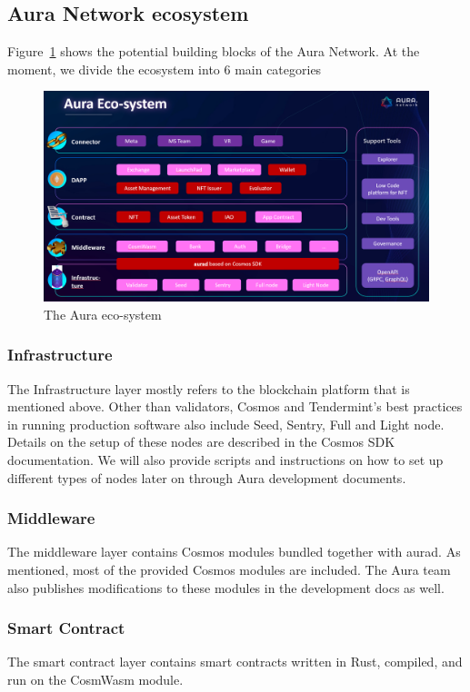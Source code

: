 \documentclass[12pt]{article}
\begin{document}
\subsection{Aura Network ecosystem}
Figure~\ref{fig:auraeco} shows the potential building blocks of the Aura Network. At the moment, we divide the ecosystem into 6 main categories

\begin{figure}[ht]
\label{fig:auraeco}
\includegraphics[width=14cm]{img/auraeco.png}
\centering
\caption{The Aura eco-system}
\end{figure}

\subsubsection*{Infrastructure}
The Infrastructure layer mostly refers to the blockchain platform that is mentioned above. Other than validators, Cosmos and Tendermint's best practices in running production software also include Seed, Sentry, Full and Light node. Details on the setup of these nodes are described in the Cosmos SDK documentation. We will also provide scripts and instructions on how to set up different types of nodes later on through Aura development documents.

\subsubsection*{Middleware}
The middleware layer contains Cosmos modules bundled together with aurad. As mentioned, most of the provided Cosmos modules are included. The Aura team also publishes modifications to these modules in the development docs as well.

\subsubsection*{Smart Contract}
The smart contract layer contains smart contracts written in Rust, compiled, and run on the CosmWasm module.
\end{document}

